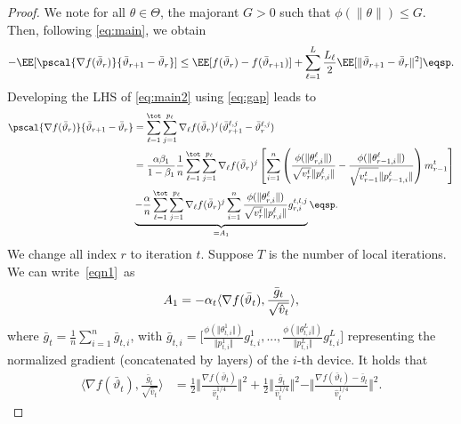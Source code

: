 \documentclass[manuscript,screen,review]{acmart}
\begin{document}
\begin{proof}
We note for all $\theta \in \Theta$, the majorant $G > 0$ such that $\phi(\|\theta \|) \leq G$. 
Then, following \eqref{eq:main}, we obtain
\begin{align}\label{eq:main2}
- \EE[  \pscal{\nabla f(\bar{\vartheta}_r)}{\bar{\vartheta}_{r+1} - \bar{\vartheta}_r}]  \leq  \EE[ f(\bar{\vartheta}_r) - f(\bar{\vartheta}_{r+1})] + \sum_{\ell =1}^L \frac{L_\ell}{2} \EE[  \| \bar{\vartheta}_{r+1} - \bar{\vartheta}_r \|^2] \eqsp.
\end{align}
Developing the LHS of \eqref{eq:main2} using \eqref{eq:gap} leads to
\begin{align} \notag
\pscal{\nabla f(\bar{\vartheta}_r)}{\bar{\vartheta}_{r+1} - \bar{\vartheta}_r} &= \sum_{\ell=1}^\tot \sum_{j=1}^{p_\ell} \nabla_{\ell} f(\bar{\vartheta}_r)^j (\bar{\vartheta}^{\ell,j}_{r+1} - \bar{\vartheta}^{\ell,j}_r)  \\ \notag
& =  \frac{\alpha \beta_1}{1-\beta_1}\frac{1}{n}  \sum_{\ell=1}^\tot \sum_{j=1}^{p_\ell} \nabla_{\ell} f(\bar{\vartheta}_r)^j \left[   \sum_{i = 1}^n  \left( \frac{\phi(\|\theta_{r,i}^{\ell}\|)}{\sqrt{v^{t}_{r}} \|p_{r,i}^{\ell}\|} - \frac{\phi(\|\theta_{r-1,i}^{\ell}\|)}{\sqrt{v^{t}_{r-1}} \|p_{r-1,i}^{\ell}\|} \right) m^{t}_{r-1}  \right] \\ \label{eqn1}
& \underbrace{ -\frac{\alpha}{n} \sum_{\ell=1}^\tot \sum_{j=1}^{p_\ell} \nabla_{\ell} f(\bar{\vartheta}_r)^j  \sum_{i = 1}^n \frac{\phi(\|\theta_{r,i}^{\ell}\|)}{\sqrt{v^{t}_{r}} \|p_{r,i}^{\ell}\|} g_{r,i}^{t,l,j}}_{= A_1}   \eqsp.
\end{align}
We change all index $r$ to iteration $t$. 
Suppose $T$ is the number of local iterations. We can write~\eqref{eqn1}~as
\begin{align}\notag
    A_1=-\alpha_t \langle \nabla f(\bar \vartheta_t),\frac{\bar g_t}{\sqrt{\hat v_t}} \rangle,
\end{align}
where $\bar g_t=\frac{1}{n}\sum_{i=1}^n \bar g_{t,i}$, with $\bar g_{t,i}=\Big[\frac{\phi(\Vert \theta_{t,i}^1\Vert)}{\Vert p_{t,i}^1\Vert}g_{t,i}^1,..., \frac{\phi(\Vert \theta_{t,i}^L\Vert)}{\Vert p_{t,i}^L\Vert}g_{t,i}^L   \Big]$ representing the normalized gradient (concatenated by layers) of the $i$-th device. It holds that
\begin{align}
    \langle \nabla f(\bar \vartheta_t),\frac{\bar g_t}{\sqrt{\hat v_t}} \rangle&=\frac{1}{2}\Vert \frac{\nabla f(\bar\vartheta_t) }{\hat v_t^{1/4}}\Vert^2+\frac{1}{2}\Vert \frac{\bar g_t }{\hat v_t^{1/4}}\Vert^2-\Vert \frac{\nabla f(\bar\vartheta_t)-\bar g_t }{\hat v_t^{1/4}}\Vert^2.  \label{eqn:x1}
\end{align}


\end{proof}
\end{document}
